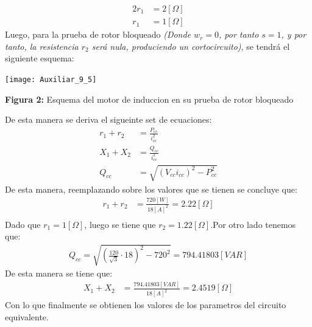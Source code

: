 \documentclass[
  11pt,
  letterpaper,
   addpoints,
   answers
  ]{exam}
\begin{document}
\begin{questions}
\begin{solution}
\begin{align}
            2r_{1} &= 2[\Omega]\\
            r_{1} &= 1[\Omega]
        \end{align}
        Luego, para la prueba de rotor bloqueado \textit{(Donde $w_r = 0$, por tanto $s = 1$, y por tanto, la resistencia $r_2$ será nula, produciendo un cortocircuito)}, se tendrá el siguiente esquema:        
        \begin{center}
            \texttt{[image: Auxiliar\_9\_5]}
        \end{center}
        \begin{center}
            \textbf{Figura 2:} Esquema del motor de induccion en su prueba de rotor bloqueado
        \end{center}
        De esta manera se deriva el sigueinte set de ecuaciones:
        \begin{align}
            r_{1} + r_{2} &= \frac{P_{cc}}{i^{2}_{cc}}\\
            X_{1} + X_{2} &= \frac{Q_{cc}}{i^{2}_{cc}}\\
            Q_{cc} &= \sqrt{(V_{cc}i_{cc})^{2} - P_{cc}^{2}}
        \end{align}
        De esta manera, reemplazando sobre los valores que se tienen se concluye que:
        \begin{align}
            r_{1} + r_{2} &= \frac{720[W]}{18[A]^{2}} = 2.22[\Omega]\\
        \end{align}
        Dado que $r_{1} = 1[\Omega]$, luego se tiene que $r_{2} = 1.22[\Omega]$.Por otro lado tenemos que:
        \begin{align}
            Q_{cc} = \sqrt{ \left(\frac{120}{\sqrt{3}} \cdot 18 \right)^{2} - 720^{2}} = 794.41803[VAR]
        \end{align}
        De esta manera se tiene que:
        \begin{align}
            X_{1} + X_{2} &= \frac{794.41803[VAR]}{18[A]^{2}} = 2.4519[\Omega]
        \end{align}
        Con lo que finalmente se obtienen los valores de los parametros del circuito equivalente.

\end{solution}
\end{questions}
\end{document}
